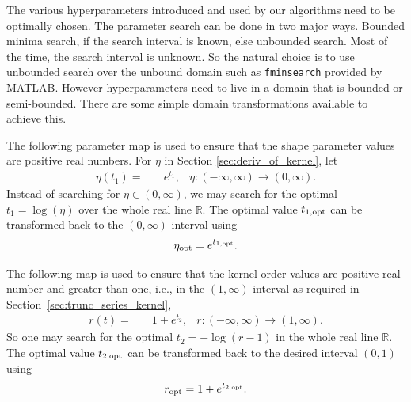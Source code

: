 \documentclass{iitthesis}          %
\newcommand{\reals}{\mathbb{R}}
\newcommand{\code}[1]{\texttt{#1}}
\newcommand\secref{Section~\ref}
\newcommand{\JRNote}[1]{}
\begin{document}
\label{sec:kernel_param_search}

\JRNote{Explain the transformation used to make the search range positive, $> 0$ , etc.}

The various hyperparameters introduced and used by our algorithms need to be optimally chosen. %
The parameter search can be done in two major ways. 
Bounded minima search, if the search interval is known, else unbounded search.  Most of the time, the search interval is unknown. So the natural choice is to use unbounded search over the unbound domain such as \code{fminsearch} provided by MATLAB.
However hyperparameters need to live in a domain that is bounded or semi-bounded. 
There are some simple domain transformations available to achieve this.

The following parameter map is used to ensure that the shape parameter values are positive real numbers. For $\eta$ in Section \ref{sec:deriv_of_kernel}, let
\begin{align*}
\eta{(t_1)} = & \quad e^{t_1}, & \eta : (-\infty, \infty) \to (0, \infty).
\end{align*}
Instead of searching for $\eta \in (0, \infty)$, we may search for the optimal $t_1 = \log(\eta)$ over the whole real line $\reals$. 
The optimal value $t_{1, \textup{opt}}$ can be transformed back to the $(0, \infty)$ interval using 
\begin{align*}
\eta_{\textup{opt}} = e^{t_{1,\textup{opt}}}.
\end{align*}



The following map is used to ensure that the kernel order values are positive real number and greater than one, i.e., in the $(1, \infty)$ interval as required in \secref{sec:trunc_series_kernel},
\begin{align*}
r(t) = & \quad {1 + e^{t_2}}, & r:  (-\infty, \infty) \to (1,\infty).
\end{align*}
So one may search for the optimal $t_2 = -\log(r-1)$ in the whole real line $\reals$.
The optimal value $t_{2, \textup{opt}}$ can be transformed back to the desired interval $(0,1)$ using 
\begin{align*}
r_{\textup{opt}} = 1+ e^{t_{2, \textup{opt}}}.
\end{align*}
\end{document}
